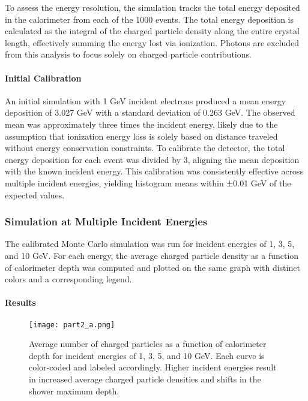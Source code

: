\documentclass[twocolumn]{aastex631}
\begin{document}
To assess the energy resolution, the simulation tracks the total energy deposited in the calorimeter from each of the 1000 events. The total energy deposition is calculated as the integral of the charged particle density along the entire crystal length, effectively summing the energy lost via ionization. Photons are excluded from this analysis to focus solely on charged particle contributions.

\paragraph{Initial Calibration}

An initial simulation with 1 GeV incident electrons produced a mean energy deposition of 3.027 GeV with a standard deviation of 0.263 GeV. The observed mean was approximately three times the incident energy, likely due to the assumption that ionization energy loss is solely based on distance traveled without energy conservation constraints. To calibrate the detector, the total energy deposition for each event was divided by 3, aligning the mean deposition with the known incident energy. This calibration was consistently effective across multiple incident energies, yielding histogram means within ±0.01 GeV of the expected values.

\subsubsection{Simulation at Multiple Incident Energies}

The calibrated Monte Carlo simulation was run for incident energies of 1, 3, 5, and 10 GeV. For each energy, the average charged particle density as a function of calorimeter depth was computed and plotted on the same graph with distinct colors and a corresponding legend.

\paragraph{Results}

\begin{figure}[htp]
    \centering
    \texttt{[image: part2\_a.png]}
    \caption{Average number of charged particles as a function of calorimeter depth for incident energies of 1, 3, 5, and 10 GeV. Each curve is color-coded and labeled accordingly. Higher incident energies result in increased average charged particle densities and shifts in the shower maximum depth.}
    \label{fig:charged_particles_multiple_energies}
\end{figure}
\end{document}
